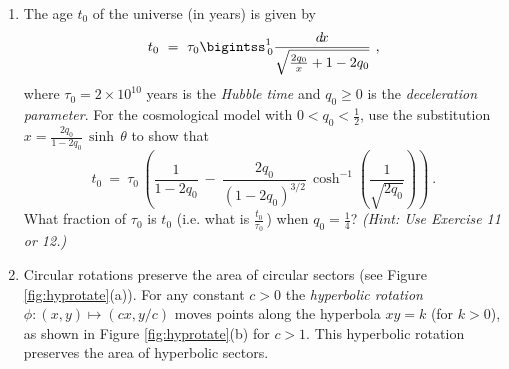 {\begin{enumerate}[\bfseries 1.]
  $M$ is defined as
\[
M ~=~ 2\pi N\mu\,\int_0^{\pi} e^{\frac{\mu H}{kT}\cos\,\theta}\sin\,\theta\;\cos\,\theta~\dtheta ~.
\]
 \begin{enumerate}[\bfseries (a)]
  \item Use the value of $n$ from Example \ref{exmp:paramag} to show that
   $\frac{M}{n\mu} ~=~ L(a)$, where $L(a) = \coth\,a - \frac{1}{a}$ is the
   \emph{Langevin function}
   and $a=\frac{\mu H}{kT}$.
  \item Show that for $a=\frac{\mu H}{kT}$, $\mu_{\text{max}} > 0$, and
  $x = \frac{\mu_{\text{max}} H}{kT}$,
\[
\int_0^{\mu_{\text{max}}} L(a)~d\!\mu ~=~ \frac{1}{x}\,\ln\,\left(\frac{\sinh\,x}{x}\right) ~.
\]
 \end{enumerate}
 \item The age $t_0$ of the universe (in years) is given by
\[
t_0 ~=~ \tau_0 \bigintss_{\,0}^1 \frac{\dx}{\sqrt{\frac{2q_0}{x} + 1 - 2q_0}} ~,
\]
where $\tau_0 = 2 \times 10^{10}$ years is the \emph{Hubble time} and
$q_0 \ge 0$ is the \emph{deceleration parameter}. For the cosmological model
with $0 < q_0 < \frac{1}{2}$, use the substitution
$x = \frac{2q_0}{1-2q_0}\,\sinh\,\theta$ to show that
\[
t_0 ~=~ \tau_0\,\left(\frac{1}{1-2q_0} ~-~
\frac{2q_0}{(1-2q_0)^{3/2}}\,\cosh^{-1}\left(\frac{1}{\sqrt{2q_0}}\right)\right) ~.
\]
What fraction of $\tau_0$ is $t_0$ (i.e. what is $\frac{t_0}{\tau_0}\,$) when
$q_0=\frac{1}{4}$? \emph{(Hint: Use Exercise 11 or 12.)}
 \item Circular rotations preserve the area of circular sectors (see
  Figure \ref{fig:hyprotate}(a)). For any constant $c>0$ the\index{$\hypsector$}
  \emph{hyperbolic rotation} $\phi: (x,y) \mapsto (cx,y/c)$ moves points along
  the hyperbola $xy=k$ (for $k>0$), as shown in Figure \ref{fig:hyprotate}(b)
  for $c>1$. This hyperbolic rotation preserves the area of hyperbolic
  sectors.
\begin{figure}[h]
 \centering
\end{figure}
\end{enumerate}}
